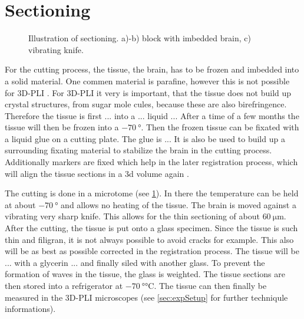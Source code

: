 \section{Sectioning}
%
\begin{figure}[!t]
	\centering
    \setlength{\tikzwidth}{0.75\textwidth}
	\caption{Illustration of sectioning. a)-b) block with imbedded brain, c) vibrating knife.}
	\label{fig:brain_sectioning}
\end{figure}
% 
For the cutting process, the tissue, \ie{} the brain, has to be frozen and imbedded into a solid material.
One commen material is parafine, however this is not possible for \ac{3D-PLI} \dummy[why?]{}.
For \ac{3D-PLI} it very is important, that the tissue does not build up crystal structures, \eg{} from sugar mole cules, because these are also birefringence.
Therefore the tissue is first ... into a ... liquid ...
After a time of a few months the tissue will then be frozen into a $\SI{-70}{\degree}$.
Then the frozen tissue can be fixated with a liquid glue on a cutting plate.
The glue is ...
It is also be used to build up a surrounding fixating material to stabilize the brain in the cutting process.
Additionally markers are fixed which help in the later registration process, which will align the tissue sections in a 3d volume again \cite{Schober2016,Ali2018,Schmitz2018}.
\par
% 
The cutting is done in a microtome (see \cref{fig:brain_sectioning}).
In there the temperature can be held at about $\SI{-70}{\degree}$ and allows no heating of the tissue.
The brain is moved against a vibrating very sharp knife.
This allows for the thin sectioning of about $\SI{60}{\micro\meter}$.
After the cutting, the tissue is put onto a glass specimen.
Since the tissue is such thin and filigran, it is not always possible to avoid cracks for example.
This also will be as best as possible corrected in the registration process.
The tissue will be ... with a glycerin ... and finally siled with another glass.
To prevent the formation of waves in the tissue, the glass is weighted.
The tissue sections are then stored into a refrigerator at $\SI{-70}{\degree\celsius}$.
The tissue can then finally be measured in the \ac{3D-PLI} microscopes (see \cref{sec:expSetup} for further techniqule informations).
% 
% 

